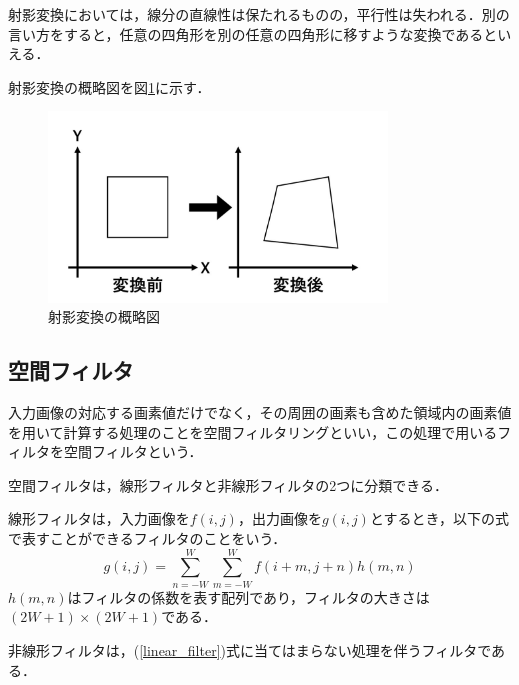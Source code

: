 \documentclass[openright]{nitocs}
\numberwithin{equation}{section}
\begin{document}
                射影変換においては，線分の直線性は保たれるものの，平行性は失われる．別の言い方をすると，任意の四角形を別の任意の四角形に移すような変換であるといえる．

                射影変換の概略図を図\ref{sample_homography}に示す．

                \begin{figure}[tb] %
                    \begin{center}
                    \includegraphics[clip,width=90mm]{Homography.jpg} 
                    \caption{射影変換の概略図}
                    \label{sample_homography}
                    \end{center}
                \end{figure}
    

        \subsection{空間フィルタ}
            入力画像の対応する画素値だけでなく，その周囲の画素も含めた領域内の画素値を用いて計算する処理のことを空間フィルタリングといい，この処理で用いるフィルタを空間フィルタという\cite{DIP}．
            
            空間フィルタは，線形フィルタと非線形フィルタの2つに分類できる．

            線形フィルタは，入力画像を$f(i,j)$，出力画像を$g(i,j)$とするとき，以下の式で表すことができるフィルタのことをいう．
            \begin{equation} \label{linear_filter}
                g(i,j) = \sum\limits_{n=-W}^{W}\sum\limits_{m=-W}^{W}f(i+m,j+n)h(m,n)
            \end{equation}
            $h(m,n)$はフィルタの係数を表す配列であり，フィルタの大きさは$(2W+1)\times(2W+1)$である．

            非線形フィルタは，(\ref{linear_filter})式に当てはまらない処理を伴うフィルタである．
\end{document}

